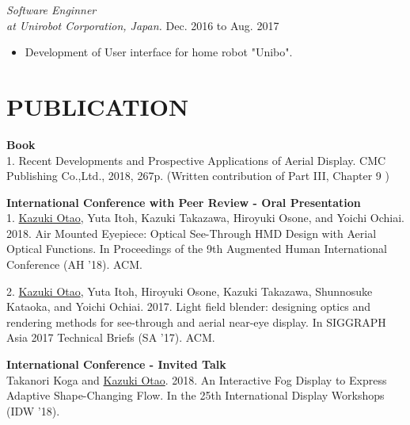 \documentclass[margin]{res}
\begin{document}
\begin{resume}
{\sl Software Enginner \\ at Unirobot Corporation, Japan.} \hfill Dec. 2016 to Aug. 2017 \\

\begin{itemize}  \itemsep -2pt
  \item Development of User interface for home robot "Unibo".
\end{itemize}

\section{PUBLICATION}

{\bf Book} \\
1. Recent Developments and Prospective Applications of Aerial Display. CMC Publishing Co.,Ltd., 2018, 267p. (Written contribution of Part III, Chapter 9 )

{\bf International Conference with Peer Review - Oral Presentation} \\
1. \underline{Kazuki Otao}, Yuta Itoh, Kazuki Takazawa, Hiroyuki Osone, and Yoichi Ochiai. 2018. Air Mounted Eyepiece: Optical See-Through HMD Design with Aerial Optical Functions. In Proceedings of the 9th Augmented Human International Conference (AH ’18). ACM.

2. \underline{Kazuki Otao}, Yuta Itoh, Hiroyuki Osone, Kazuki Takazawa, Shunnosuke Kataoka, and Yoichi Ochiai. 2017. Light field blender: designing optics and rendering methods for see-through and aerial near-eye display. In SIGGRAPH Asia 2017 Technical Briefs (SA '17). ACM.

{\bf International Conference - Invited Talk} \\
Takanori Koga and \underline{Kazuki Otao}. 2018. An Interactive Fog Display to Express Adaptive Shape-Changing Flow. In the 25th International Display Workshops (IDW '18).

\end{resume}
\end{document}
